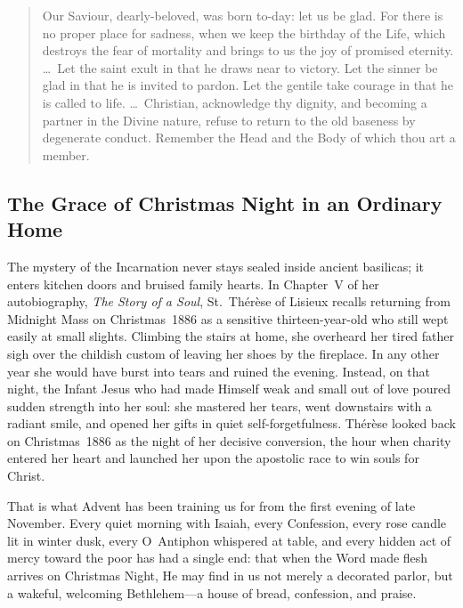 \begin{quote}
Our Saviour, dearly-beloved, was born to-day: let us be glad. For there is no proper place for sadness, when we keep the birthday of the Life, which destroys the fear of mortality and brings to us the joy of promised eternity. \dots\ Let the saint exult in that he draws near to victory. Let the sinner be glad in that he is invited to pardon. Let the gentile take courage in that he is called to life. \dots\ Christian, acknowledge thy dignity, and becoming a partner in the Divine nature, refuse to return to the old baseness by degenerate conduct. Remember the Head and the Body of which thou art a member.
\end{quote}

\subsection{The Grace of Christmas Night in an Ordinary Home}

The mystery of the Incarnation never stays sealed inside ancient basilicas; it enters kitchen doors and bruised family hearts. In Chapter~V of her autobiography, \textit{The Story of a Soul}, St.~Th\'er\`ese of Lisieux recalls returning from Midnight Mass on Christmas~1886 as a sensitive thirteen-year-old who still wept easily at small slights. Climbing the stairs at home, she overheard her tired father sigh over the childish custom of leaving her shoes by the fireplace. In any other year she would have burst into tears and ruined the evening. Instead, on that night, the Infant Jesus who had made Himself weak and small out of love poured sudden strength into her soul: she mastered her tears, went downstairs with a radiant smile, and opened her gifts in quiet self-forgetfulness. Th\'er\`ese looked back on Christmas~1886 as the night of her decisive conversion, the hour when charity entered her heart and launched her upon the apostolic race to win souls for Christ.

That is what Advent has been training us for from the first evening of late November. Every quiet morning with Isaiah, every Confession, every rose candle lit in winter dusk, every O~Antiphon whispered at table, and every hidden act of mercy toward the poor has had a single end: that when the Word made flesh arrives on Christmas Night, He may find in us not merely a decorated parlor, but a wakeful, welcoming Bethlehem---a house of bread, confession, and praise.
